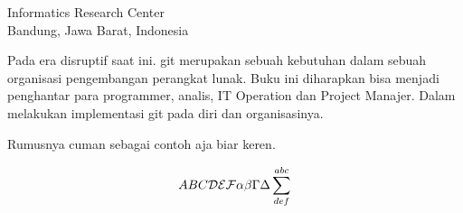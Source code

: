 

{Informatics Research Center\\
Bandung, Jawa Barat, Indonesia}

Pada era disruptif   
saat ini. git merupakan sebuah kebutuhan dalam sebuah organisasi pengembangan perangkat lunak.
Buku ini diharapkan bisa menjadi penghantar para programmer, analis, IT Operation dan Project Manajer.
Dalam melakukan implementasi git pada diri dan organisasinya.

Rumusnya cuman sebagai contoh aja biar keren\cite{awangga2018sampeu}.

\begin{equation}
ABC {\cal DEF} \alpha\beta\Gamma\Delta\sum^{abc}_{def}
\end{equation}
